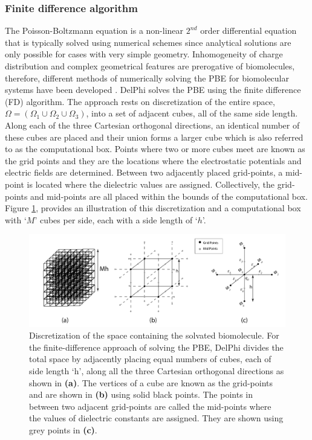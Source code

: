 \documentclass[9pt,tutorial]{livecoms}
\begin{document}
\subsubsection{Finite difference algorithm}
The Poisson-Boltzmann equation is a non-linear $2^{nd}$ order differential equation that is typically solved using numerical schemes since analytical solutions are only possible for cases with very simple geometry. Inhomogeneity of charge distribution and complex geometrical features are prerogative of biomolecules, therefore, different methods of numerically solving the PBE for biomolecular systems have been developed \cite{klapper1986focusing,davis1989solving,cortis1997numerical,baker2001electrostatics,shestakov2002solution,miertuvs1981electrostatic,totrov2001rapid,lu2009adaptive}. 
DelPhi solves the PBE using the finite difference (FD) algorithm. The approach rests on discretization of the entire space, $ \Omega=(\Omega_1 \cup \Omega_2 \cup \Omega_3)$, into a set of adjacent cubes, all of the same side length. Along each of the three Cartesian orthogonal directions, an identical number of these cubes are placed and their union forms a larger cube which is also referred to as the computational box. Points where two or more cubes meet are known as the grid points and they are the locations where the electrostatic potentials and electric fields are determined.  Between two adjacently placed grid-points, a mid-point is located where the dielectric values are assigned. Collectively, the grid-points and mid-points are all placed within the bounds of the computational box. Figure \ref{fig:grid-scheme-representation}, provides an illustration of this discretization and a computational box with ‘$ M $’ cubes per side, each with a side length of ‘$ h $’. 

\begin{figure}
\includegraphics[width=0.95\linewidth]{Figure_3.png}
\caption{Discretization of the space containing the solvated biomolecule. For the finite-difference approach of solving the PBE, DelPhi divides the total space by adjacently placing equal numbers of cubes, each of side length ‘h’, along all the three Cartesian orthogonal directions as shown in \textbf{(a)}. The vertices of a cube are known as the grid-points and are shown in \textbf{(b)} using solid black points. The points in between two adjacent grid-points are called the mid-points where the values of dielectric constants are assigned. They are shown using grey points in \textbf{(c)}.}
\label{fig:grid-scheme-representation}
\end{figure}
 
\end{document}
